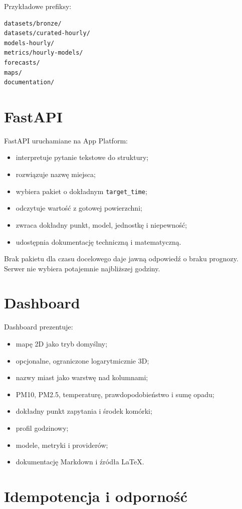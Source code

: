 \documentclass[11pt,a4paper,oneside]{article}
\begin{document}
Przykładowe prefiksy:
\begin{lstlisting}[style=code]
datasets/bronze/
datasets/curated-hourly/
models-hourly/
metrics/hourly-models/
forecasts/
maps/
documentation/
\end{lstlisting}

\section{FastAPI}

FastAPI uruchamiane na App Platform:
\begin{itemize}[nosep]
  \item interpretuje pytanie tekstowe do struktury;
  \item rozwiązuje nazwę miejsca;
  \item wybiera pakiet o dokładnym \texttt{target\_time};
  \item odczytuje wartość z gotowej powierzchni;
  \item zwraca dokładny punkt, model, jednostkę i niepewność;
  \item udostępnia dokumentację techniczną i matematyczną.
\end{itemize}

Brak pakietu dla czasu docelowego daje jawną odpowiedź o braku prognozy.
Serwer nie wybiera potajemnie najbliższej godziny.

\section{Dashboard}

Dashboard prezentuje:
\begin{itemize}[nosep]
  \item mapę 2D jako tryb domyślny;
  \item opcjonalne, ograniczone logarytmicznie 3D;
  \item nazwy miast jako warstwę nad kolumnami;
  \item PM10, PM2.5, temperaturę, prawdopodobieństwo i sumę opadu;
  \item dokładny punkt zapytania i środek komórki;
  \item profil godzinowy;
  \item modele, metryki i providerów;
  \item dokumentację Markdown i źródła LaTeX.
\end{itemize}

\section{Idempotencja i odporność}
\end{document}
